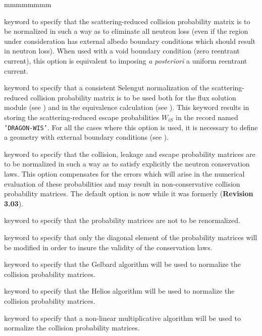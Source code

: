 \begin{ListeDeDescription}{mmmmmmmm}
\item[\moc{NORM}] keyword to specify that the scattering-reduced collision probability matrix is
to be normalized in such a way as to eliminate all neutron loss (even if the
region under consideration has external albedo boundary conditions which should
result in neutron loss). When used with a void boundary condition (zero reentrant
current), this option is equivalent to imposing  {\it a posteriori} a uniform
reentrant current.

\item[\moc{ALBS}] keyword to specify that a consistent Selengut normalization
of the scattering-reduced collision probability matrix is to be used both for the flux solution
module (see ) and in the equivalence calculation (see
). This keyword results in storing the scattering-reduced escape probabilities
$W_{iS}$ in the record named {\tt 'DRAGON-WIS'}. For all the cases where this option is used, it is necessary to
define a geometry with  external boundary conditions (see
).

\item[\moc{PNOR}] keyword to specify that the collision, leakage and escape
probability matrices are to be normalized in such a way as to satisfy explicitly
the neutron conservation laws. This option compensates for the errors which will
arise in the numerical evaluation of these probabilities and may result in
non-conservative collision probability matrices. The default option is now  while it was
formerly  ({\bf Revision 3.03}).

\item[\moc{NONE}] keyword to specify that the probability matrices are not to
be renormalized.

\item[\moc{DIAG}] keyword to specify that only the diagonal element of the
probability matrices will be modified in order to insure the validity of the
conservation laws.

\item[\moc{GELB}] keyword to specify that the Gelbard algorithm will be used
to normalize the collision probability matrices.\cite{RENOR} 

\item[\moc{HELI}] keyword to specify that the Helios algorithm will be used
to normalize the collision probability matrices.\cite{Helios} 

\item[\moc{NONL}] keyword to specify that a non-linear multiplicative
algorithm will be used to normalize the collision probability
matrices.\cite{RENOR} 


\end{ListeDeDescription}
